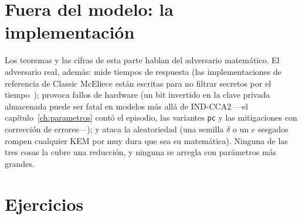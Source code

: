 \documentclass[11pt,a4paper,oneside]{report}
\begin{document}
\section{Fuera del modelo: la implementación}

\begin{practica}
Los teoremas y las cifras de esta parte hablan del adversario
matemático. El adversario real, además: mide tiempos de respuesta
(las implementaciones de referencia de Classic McEliece están
escritas para no filtrar secretos por el tiempo~\cite{cmimpl});
provoca fallos de hardware (un bit invertido en la clave privada
almacenada puede ser fatal en modelos más allá de IND-CCA2 ---el
capítulo~\ref{ch:parametros} contó el episodio, las variantes
\texttt{pc} y las mitigaciones con corrección de errores---); y
ataca la aleatoriedad (una semilla $\delta$ o un $e$ sesgados rompen
cualquier KEM por muy dura que sea su matemática). Ninguna de las
tres cosas la cubre una reducción, y ninguna se arregla con
parámetros más grandes.
\end{practica}

\section{Ejercicios}
\end{document}

